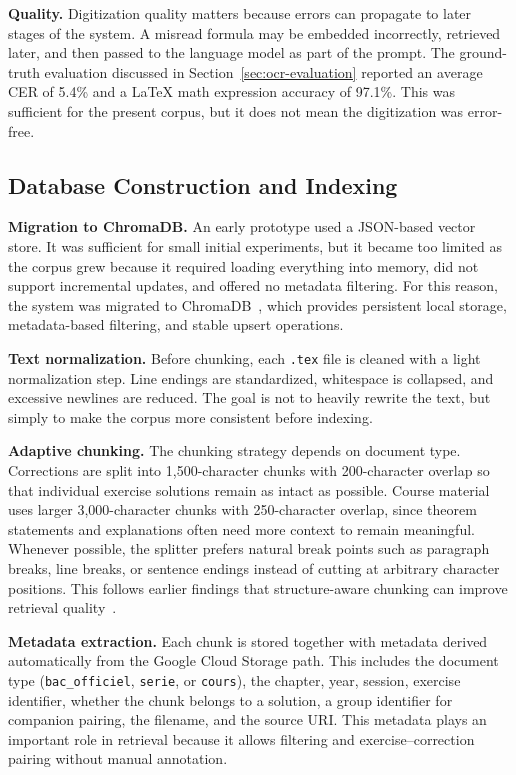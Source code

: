 \textbf{Quality.} Digitization quality matters because errors can propagate
to later stages of the system. A misread formula may be embedded
incorrectly, retrieved later, and then passed to the language model as part
of the prompt. The ground-truth evaluation discussed in
Section~\ref{sec:ocr-evaluation} reported an average CER of 5.4\% and a
\LaTeX{} math expression accuracy of 97.1\%. This was sufficient for the
present corpus, but it does not mean the digitization was error-free.

\subsection{Database Construction and Indexing}
\label{subsec:database-construction}

\textbf{Migration to ChromaDB.} An early prototype used a JSON-based vector
store. It was sufficient for small initial experiments, but it became too
limited as the corpus grew because it required loading everything into
memory, did not support incremental updates, and offered no metadata
filtering. For this reason, the system was migrated to
ChromaDB~\cite{chromadb2024}, which provides persistent local storage,
metadata-based filtering, and stable upsert operations.

\textbf{Text normalization.} Before chunking, each \texttt{.tex} file is
cleaned with a light normalization step. Line endings are standardized,
whitespace is collapsed, and excessive newlines are reduced. The goal is not
to heavily rewrite the text, but simply to make the corpus more consistent
before indexing.

\textbf{Adaptive chunking.} The chunking strategy depends on document type.
Corrections are split into 1{,}500-character chunks with 200-character
overlap so that individual exercise solutions remain as intact as possible.
Course material uses larger 3{,}000-character chunks with 250-character
overlap, since theorem statements and explanations often need more context
to remain meaningful. Whenever possible, the splitter prefers natural break
points such as paragraph breaks, line breaks, or sentence endings instead of
cutting at arbitrary character positions. This follows earlier findings that
structure-aware chunking can improve retrieval quality~\cite{zhao2024financial_chunking, chen2024mog}.

\textbf{Metadata extraction.} Each chunk is stored together with metadata
derived automatically from the Google Cloud Storage path. This includes the
document type (\texttt{bac\_officiel}, \texttt{serie}, or \texttt{cours}),
the chapter, year, session, exercise identifier, whether the chunk belongs
to a solution, a group identifier for companion pairing, the filename, and
the source URI. This metadata plays an important role in retrieval because
it allows filtering and exercise--correction pairing without manual
annotation.

